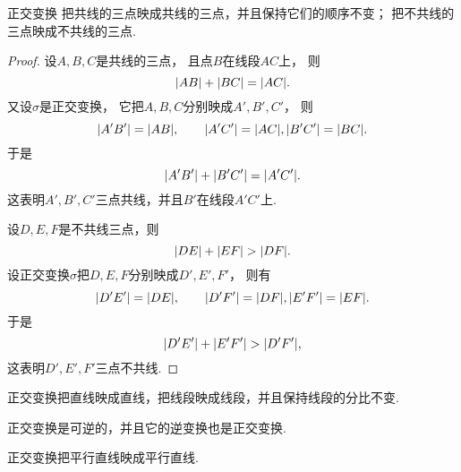\begin{property}
正交变换
把共线的三点映成共线的三点，并且保持它们的顺序不变；
把不共线的三点映成不共线的三点.
\begin{proof}
设\(A,B,C\)是共线的三点，
且点\(B\)在线段\(AC\)上，
则\begin{equation*}
	\abs{AB} + \abs{BC}
	= \abs{AC}.
\end{equation*}
又设\(\sigma\)是正交变换，
它把\(A,B,C\)分别映成\(A',B',C'\)，
则\begin{equation*}
	\abs{A'B'}
	= \abs{AB},
	\qquad
	\abs{A'C'}
	= \abs{AC},
	\abs{B'C'}
	= \abs{BC}.
\end{equation*}
于是\begin{equation*}
	\abs{A'B'}
	+ \abs{B'C'}
	= \abs{A'C'}.
\end{equation*}
这表明\(A',B',C'\)三点共线，并且\(B'\)在线段\(A'C'\)上.

设\(D,E,F\)是不共线三点，则\begin{equation*}
	\abs{DE}
	+ \abs{EF}
	> \abs{DF}.
\end{equation*}
设正交变换\(\sigma\)把\(D,E,F\)分别映成\(D',E',F'\)，
则有\begin{equation*}
	\abs{D'E'}
	= \abs{DE},
	\qquad
	\abs{D'F'}
	= \abs{DF},
	\abs{E'F'}
	= \abs{EF}.
\end{equation*}
于是\begin{equation*}
	\abs{D'E'}
	+ \abs{E'F'}
	> \abs{D'F'},
\end{equation*}
这表明\(D',E',F'\)三点不共线.
\end{proof}
\end{property}

\begin{property}
正交变换把直线映成直线，把线段映成线段，并且保持线段的分比不变.
\end{property}

\begin{property}
正交变换是可逆的，并且它的逆变换也是正交变换.
\end{property}

\begin{property}
正交变换把平行直线映成平行直线.
\end{property}

